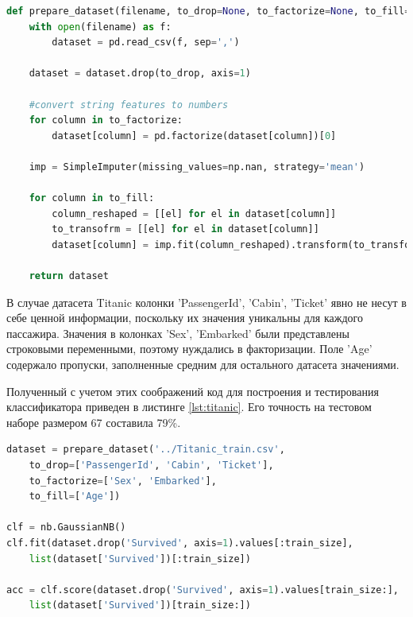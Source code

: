 \documentclass[a4paper,14pt]{article}
\begin{document}
\begin{lstlisting}[caption={Чтение и предобработка входных данных}, label={lst:preprocess}, language=Python, breakatwhitespace=true, tabsize=2]
def prepare_dataset(filename, to_drop=None, to_factorize=None, to_fill=None):
	with open(filename) as f:
		dataset = pd.read_csv(f, sep=',')

	dataset = dataset.drop(to_drop, axis=1)

	#convert string features to numbers
	for column in to_factorize:
		dataset[column] = pd.factorize(dataset[column])[0]

	imp = SimpleImputer(missing_values=np.nan, strategy='mean')

	for column in to_fill:
		column_reshaped = [[el] for el in dataset[column]]
		to_transofrm = [[el] for el in dataset[column]]
		dataset[column] = imp.fit(column_reshaped).transform(to_transform)

	return dataset
\end{lstlisting}

В случае датасета Titanic колонки 'PassengerId', 'Cabin', 'Ticket' явно не несут в себе ценной информации, поскольку их значения уникальны для каждого пассажира. Значения в колонках 'Sex', 'Embarked' были представлены строковыми переменными, поэтому нуждались в факторизации. Поле 'Age' содержало пропуски, заполненные средним для остального датасета значениями.

Полученный с учетом этих соображений код для построения и тестирования классификатора приведен в листинге \ref{lst:titanic}. Его точность на тестовом наборе размером 67 составила 79\%.

\begin{lstlisting}[caption={Построение классификатора для датасета Titanic}, label={lst:titanic}, language=Python]
dataset = prepare_dataset('../Titanic_train.csv',
	to_drop=['PassengerId', 'Cabin', 'Ticket'],
	to_factorize=['Sex', 'Embarked'],
	to_fill=['Age'])

clf = nb.GaussianNB()
clf.fit(dataset.drop('Survived', axis=1).values[:train_size], 
	list(dataset['Survived'])[:train_size])

acc = clf.score(dataset.drop('Survived', axis=1).values[train_size:], 
	list(dataset['Survived'])[train_size:])
\end{lstlisting}
\end{document}
